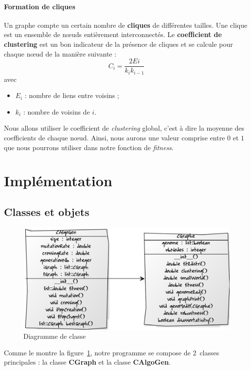 \paragraph*{Formation de cliques\\}

Un graphe compte un certain nombre de \textbf{cliques} de différentes tailles. Une clique est un ensemble de nœuds entièrement interconnectés. Le \textbf{coefficient de clustering} est un bon indicateur de la présence de cliques et se calcule pour chaque nœud de la manière suivante :
$$ C_i = \frac{2Ei}{k_i k_{i-1}} $$
avec
\begin{itemize}
 \item $E_i$ : nombre de liens entre voisins ;
 \item $k_i$ : nombre de voisins de $i$.
\end{itemize}
Nous allons utiliser le coefficient de \textit{clustering} global, c'est à dire la moyenne des coefficients de chaque nœud. Ainsi, nous aurons une valeur comprise entre $0$ et $1$ que nous pourrons utiliser dans notre fonction de \textit{fitness}.


\section{Implémentation}

\subsection{Classes et objets}
\begin{figure}
\includegraphics[width=\linewidth]{diagramme}
\caption{Diagramme de classe}
\label{diag}
\end{figure}
Comme le montre la figure~\ref{diag}, notre programme se compose de 2~classes principales : la classe \textbf{CGraph} et la classe \textbf{CAlgoGen}.

